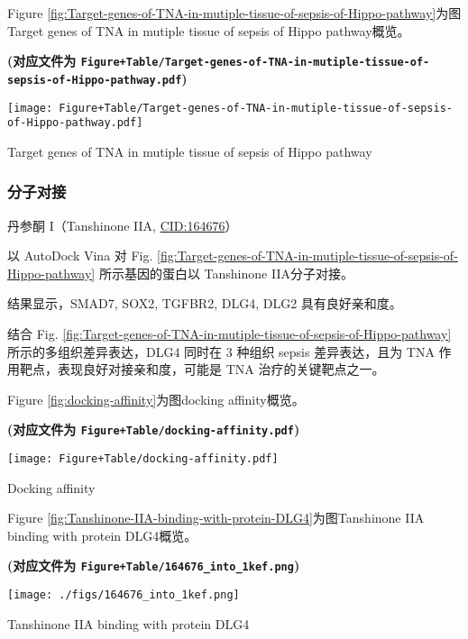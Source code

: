 \documentclass[
]{article}
\begin{document}
Figure \ref{fig:Target-genes-of-TNA-in-mutiple-tissue-of-sepsis-of-Hippo-pathway}为图Target genes of TNA in mutiple tissue of sepsis of Hippo pathway概览。

\textbf{(对应文件为 \texttt{Figure+Table/Target-genes-of-TNA-in-mutiple-tissue-of-sepsis-of-Hippo-pathway.pdf})}

\def\@captype{figure}
\begin{center}
\texttt{[image: Figure+Table/Target-genes-of-TNA-in-mutiple-tissue-of-sepsis-of-Hippo-pathway.pdf]}
\caption{Target genes of TNA in mutiple tissue of sepsis of Hippo pathway}\label{fig:Target-genes-of-TNA-in-mutiple-tissue-of-sepsis-of-Hippo-pathway}
\end{center}

\hypertarget{ux5206ux5b50ux5bf9ux63a5}{%
\subsubsection{分子对接}\label{ux5206ux5b50ux5bf9ux63a5}}

丹参酮 I（Tanshinone IIA, \url{CID:164676}）

以 AutoDock Vina 对 Fig. \ref{fig:Target-genes-of-TNA-in-mutiple-tissue-of-sepsis-of-Hippo-pathway} 所示基因的蛋白以 Tanshinone IIA分子对接。

结果显示，SMAD7, SOX2, TGFBR2, DLG4, DLG2 具有良好亲和度。

结合 Fig. \ref{fig:Target-genes-of-TNA-in-mutiple-tissue-of-sepsis-of-Hippo-pathway} 所示的多组织差异表达，DLG4 同时在 3 种组织 sepsis 差异表达，且为 TNA 作用靶点，表现良好对接亲和度，可能是 TNA 治疗的关键靶点之一。

Figure \ref{fig:docking-affinity}为图docking affinity概览。

\textbf{(对应文件为 \texttt{Figure+Table/docking-affinity.pdf})}

\def\@captype{figure}
\begin{center}
\texttt{[image: Figure+Table/docking-affinity.pdf]}
\caption{Docking affinity}\label{fig:docking-affinity}
\end{center}

Figure \ref{fig:Tanshinone-IIA-binding-with-protein-DLG4}为图Tanshinone IIA binding with protein DLG4概览。

\textbf{(对应文件为 \texttt{Figure+Table/164676\_into\_1kef.png})}

\def\@captype{figure}
\begin{center}
\texttt{[image: ./figs/164676\_into\_1kef.png]}
\caption{Tanshinone IIA binding with protein DLG4}\label{fig:Tanshinone-IIA-binding-with-protein-DLG4}
\end{center}
\end{document}
